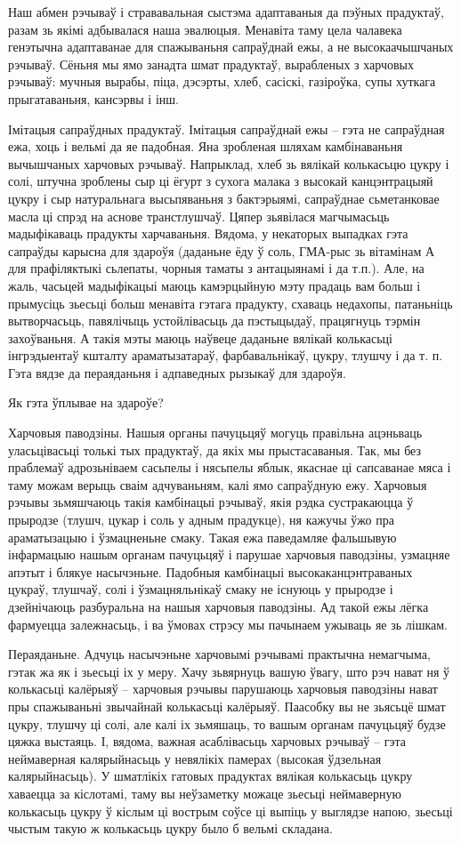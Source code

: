 Наш абмен рэчываў і стрававальная сыстэма адаптаваныя да пэўных прадуктаў, разам зь якімі адбывалася наша эвалюцыя. Менавіта таму цела чалавека генэтычна адаптаванае для спажываньня сапраўднай ежы, а не высокаачышчаных рэчываў. Сёньня мы ямо занадта шмат прадуктаў, вырабленых з харчовых рэчываў: мучныя вырабы, піца, дэсэрты, хлеб, сасіскі, газіроўка, супы хуткага прыгатаваньня, кансэрвы і інш.

Імітацыя сапраўдных прадуктаў.
Імітацыя сапраўднай ежы – гэта не сапраўдная ежа, хоць і вельмі да яе падобная. Яна зробленая шляхам камбінаваньня вычышчаных харчовых рэчываў. Напрыклад, хлеб зь вялікай колькасьцю цукру і солі, штучна зроблены сыр ці ёгурт з сухога малака з высокай канцэнтрацыяй цукру і сыр натуральнага высьпяваньня з бактэрыямі, сапраўднае сьметанковае масла ці спрэд на аснове транстлушчаў.
Цяпер зьявілася магчымасьць мадыфікаваць прадукты харчаваньня. Вядома, у некаторых выпадках гэта сапраўды карысна для здароўя (даданьне ёду ў соль, ГМА-рыс зь вітамінам А для прафіляктыкі сьлепаты, чорныя таматы з антацыянамі і да т.п.). Але, на жаль, часьцей мадыфікацыі маюць камэрцыйную мэту прадаць вам больш і прымусіць зьесьці больш менавіта гэтага прадукту, схаваць недахопы, патаньніць вытворчасьць, павялічыць устойлівасьць да пэстыцыдаў, працягнуць тэрмін захоўваньня. А такія мэты маюць наўвеце даданьне вялікай колькасьці інгрэдыентаў кшталту араматызатараў, фарбавальнікаў, цукру, тлушчу і да т. п. Гэта вядзе да пераяданьня і адпаведных рызыкаў для здароўя.

Як гэта ўплывае на здароўе?

Харчовыя паводзіны.
Нашыя органы пачуцьцяў могуць правільна ацэньваць уласьцівасьці толькі тых прадуктаў, да якіх мы прыстасаваныя. Так, мы без праблемаў адрозьніваем сасьпелы і нясьпелы яблык, якаснае ці сапсаванае мяса і таму можам верыць сваім адчуваньням, калі ямо сапраўдную ежу. Харчовыя рэчывы зьмяшчаюць такія камбінацыі рэчываў, якія рэдка сустракаюцца ў прыродзе (тлушч, цукар і соль у адным прадукце), ня кажучы ўжо пра араматызацыю і ўзмацненьне смаку. Такая ежа паведамляе фальшывую інфармацыю нашым органам пачуцьцяў і парушае харчовыя паводзіны, узмацняе апэтыт і блякуе насычэньне. Падобныя камбінацыі высокаканцэнтраваных цукраў, тлушчаў, солі і ўзмацняльнікаў смаку не існуюць у прыродзе і дзейнічаюць разбуральна на нашыя харчовыя паводзіны. Ад такой ежы лёгка фармуецца залежнасьць, і ва ўмовах стрэсу мы пачынаем ужываць яе зь лішкам.

Пераяданьне.
Адчуць насычэньне харчовымі рэчывамі практычна немагчыма, гэтак жа як і зьесьці іх у меру. Хачу зьвярнуць вашую ўвагу, што рэч нават ня ў колькасьці калёрыяў – харчовыя рэчывы парушаюць харчовыя паводзіны нават пры спажываньні звычайнай колькасьці калёрыяў. Паасобку вы не зьясьцё шмат цукру, тлушчу ці солі, але калі іх зьмяшаць, то вашым органам пачуцьцяў будзе цяжка выстаяць. І, вядома, важная асаблівасьць харчовых рэчываў – гэта неймаверная калярыйнасьць у невялікіх памерах (высокая ўдзельная калярыйнасьць). У шматлікіх гатовых прадуктах вялікая колькасьць цукру хаваецца за кіслотамі, таму вы неўзаметку можаце зьесьці неймаверную колькасьць цукру ў кіслым ці вострым соўсе ці выпіць у выглядзе напою, зьесьці чыстым такую ж колькасьць цукру было б вельмі складана.


